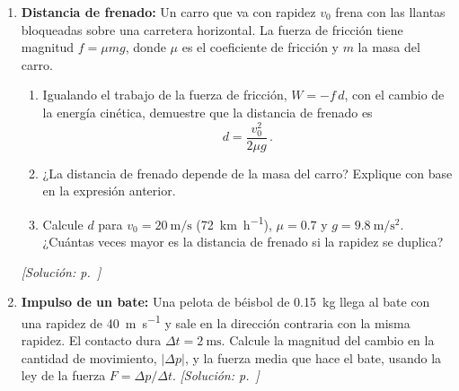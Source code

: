 \begin{enumerate}[label=\textbf{P\arabic*.}, ref=P\arabic*, leftmargin=*]
    \item\label{prob:parcial2-frenado} \textbf{Distancia de frenado:} Un
    carro que va con rapidez $v_0$ frena con las llantas bloqueadas sobre una
    carretera horizontal. La fuerza de fricción tiene magnitud
    $f = \mu m g$, donde $\mu$ es el coeficiente de fricción y $m$ la masa
    del carro.
    \begin{enumerate}
        \item Igualando el trabajo de la fuerza de fricción, $W = -f\,d$, con
        el cambio de la energía cinética, demuestre que la distancia de
        frenado es
        \begin{equation*}
            d = \frac{v_0^2}{2\mu g}\,.
        \end{equation*}
        \item ¿La distancia de frenado depende de la masa del carro? Explique
        con base en la expresión anterior.
        \item Calcule $d$ para $v_0 = \SI{20}{\meter\per\second}$
        (\SI{72}{\kilo\meter\per\hour}), $\mu = 0.7$ y
        $g = \SI{9.8}{\meter\per\second\squared}$. ¿Cuántas veces mayor es la
        distancia de frenado si la rapidez se duplica?
    \end{enumerate}
    \hfill\textit{[Solución: p.~\pageref{sol:parcial2-frenado}]}

    \item\label{prob:parcial2-impulso} \textbf{Impulso de un bate:} Una
    pelota de béisbol de \SI{0.15}{\kilogram} llega al bate con una rapidez
    de \SI{40}{\meter\per\second} y sale en la dirección contraria con la
    misma rapidez. El contacto dura $\Delta t = \SI{2}{\milli\second}$.
    Calcule la magnitud del cambio en la cantidad de movimiento,
    $\lvert\Delta p\rvert$, y la fuerza media que hace el bate, usando la ley
    de la fuerza $F = \Delta p/\Delta t$.
    \hfill\textit{[Solución: p.~\pageref{sol:parcial2-impulso}]}


\end{enumerate}
